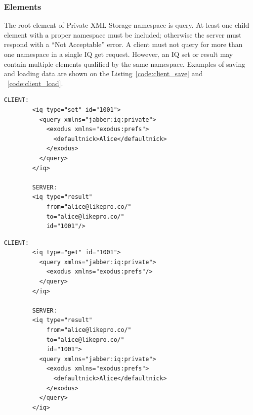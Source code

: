 	\subsubsection{Elements}
	The root element of Private XML Storage namespace is query. At least one child element with a proper namespace must be included; otherwise the server must respond with a ``Not Acceptable'' error. A client must not query for more than one namespace in a single IQ get request. However, an IQ set or result may contain multiple elements qualified by the same namespace. Examples of saving and loading data are shown on the Listing~\ref{code:client_save} and ~\ref{code:client_load}.

    \begin{lstlisting}[label=code:client_save,caption=Client Stores Private Data]
		CLIENT:
		<iq type="set" id="1001">
		  <query xmlns="jabber:iq:private">
		    <exodus xmlns="exodus:prefs">
		      <defaultnick>Alice</defaultnick>
		    </exodus>
		  </query>
		</iq>

		SERVER:
		<iq type="result"
		    from="alice@likepro.co/"
		    to="alice@likepro.co/"
		    id="1001"/>
    \end{lstlisting}

     \begin{lstlisting}[label=code:client_load,caption=Client Retrieves Private Data]
		CLIENT:
		<iq type="get" id="1001">
		  <query xmlns="jabber:iq:private">
		    <exodus xmlns="exodus:prefs"/>
		  </query>
		</iq>

		SERVER:
		<iq type="result"
		    from="alice@likepro.co/"
		    to="alice@likepro.co/"
		    id="1001">
		  <query xmlns="jabber:iq:private">
		    <exodus xmlns="exodus:prefs">
		      <defaultnick>Alice</defaultnick>
		    </exodus>
		  </query>
		</iq>
    \end{lstlisting}

